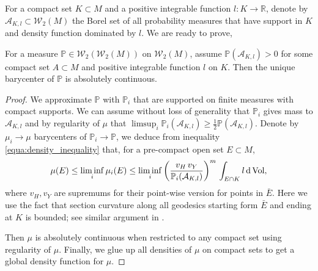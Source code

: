For a compact set $K \subset M$ and a positive integrable function $l: K \rightarrow \mathbb{R}$,
denote by $\mathcal{A}_{K, l} \subset \mathcal{W}_2(M)$ the Borel set of
all probability measures that have support in $K$ and density function dominated by $l$.
We are ready to prove,

\begin{thm}
	For a measure $\mathbb{P} \in \mathcal{W}_2(\mathcal{W}_2(M))$ on $\mathcal{W}_2(M)$,
	assume $\mathbb{P}(\mathcal{A}_{K,l}) >0$ for some compact set $A \subset M$ and positive
	integrable function $l$ on $K$.
	Then the unique barycenter of $\mathbb{P}$
	is absolutely continuous.
\end{thm}

\begin{proof}
	We approximate $\mathbb{P}$ with $ \mathbb{P}_i $
	that are supported on finite measures with compact supports.
	We can assume without loss of generality that $\mathbb{P}_i$ gives mass to $\mathcal{A}_{K,l}$ and
	by regularity of $\mu$ that
	$\limsup_{i}\mathbb{P}_i(\mathcal{A}_{K,l}) \geq \frac{1}{2} \mathbb{P}(\mathcal{A}_{K,l}).$
	Denote by $\mu_i \rightarrow \mu$ barycenters of $\mathbb{P}_i \rightarrow \mathbb{P}$,
	we deduce from inequality \cref{equa:density_inequality} that,
	for a pre-compact open set $E \subset M$,
	\[
		\mu(E) \leq \liminf_i \mu_i(E) \leq
		\liminf_i \left(\frac{v_H\, v_Y}{\mathbb{P}_i(\mathcal{A}_{K,l})}\right)^m
		\, \int_{E \cap K} l \operatorname{d} \operatorname{Vol},
	\]
	where $v_H, v_Y$ are supremums for their point-wise version for points in $\bar{E}$.
	Here we use the fact that section curvature along all geodesics starting form $\bar{E}$ and
	ending at $K$ is bounded;
	see similar argument in \cite[Corollary 3.3.7]{cordero2001riemannian}.

	Then $\mu$ is absolutely continuous when restricted to any compact set using regularity of $\mu$.
	Finally, we glue up all densities of $\mu$ on compact sets to get a global density function for $\mu$.
\end{proof}

